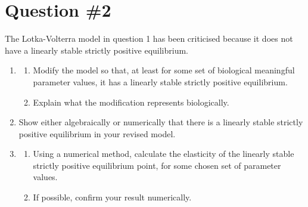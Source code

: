 \documentclass[11pt]{report}
\begin{document}
	\chapter*{Question \#2}
	The Lotka-Volterra model in question 1 has been criticised because it does not have a linearly stable strictly positive equilibrium.
		\begin{enumerate}[label=\alph*)]
			\item 
				\begin{enumerate}[label=\roman*)]
					\item Modify the model so that, at least for some set of biological meaningful parameter values, it has a linearly stable strictly positive equilibrium. 
					\item Explain what the modification represents biologically.
				\end{enumerate}
			\item Show either algebraically or numerically that there is a linearly stable strictly positive equilibrium in your revised model.
			\item 
				\begin{enumerate}[label=\roman*)]
					\item Using a numerical method, calculate the elasticity of the linearly stable strictly positive equilibrium point, for some chosen set of parameter values.
					\item If possible, confirm your result numerically.
				\end{enumerate} 
			
		\end{enumerate}
\end{document}
